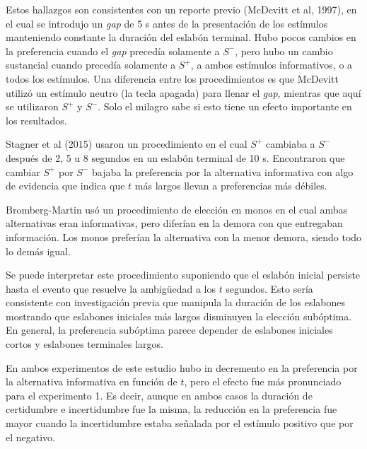 \documentclass[a4paper,12pt]{article}
\begin{document}
\vspace{2mm}
{\centering{}}
\vspace{2mm}

Estos hallazgos son consistentes con un reporte previo (McDevitt et al, 1997), en el cual se introdujo un {\slshape gap} de 5 s antes de la presentación de los estímulos manteniendo constante la duración del eslabón terminal.
Hubo pocos cambios en la preferencia cuando el {\slshape gap} precedía solamente a $S^{-}$, pero hubo un cambio sustancial cuando precedía solamente a $S^{+}$, a ambos estímulos informativos, o a todos los estímulos.
Una diferencia entre los procedimientos es que McDevitt utilizó un estímulo neutro (la tecla apagada) para llenar el {\slshape gap}, mientras que aquí se utilizaron $S^{+}$ y $S^{-}$.
Solo el milagro sabe si esto tiene un efecto importante en los resultados.

Stagner et al (2015) usaron un procedimiento en el cual $S^{+}$ cambiaba a $S^{-}$ después de 2, 5 u 8 segundos en un eslabón terminal de 10 s.
Encontraron que cambiar $S^{+}$ por $S^{-}$ bajaba la preferencia por la alternativa informativa con algo de evidencia que indica que $t$ más largos llevan a preferencias más débiles.

Bromberg-Martin usó un procedimiento de elección en monos en el cual ambas alternativas eran informativas, pero diferían en la demora con que entregaban información.
Los monos preferían la alternativa con la menor demora, siendo todo lo demás igual.

Se puede interpretar este procedimiento suponiendo que el eslabón inicial persiste hasta el evento que resuelve la ambigüedad a los $t$ segundos.
Esto sería consistente con investigación previa que manipula la duración de los eslabones mostrando que eslabones iniciales más largos disminuyen la elección subóptima.
En general, la preferencia subóptima parece depender de eslabones iniciales cortos y eslabones terminales largos.

En ambos experimentos de este estudio hubo in decremento en la preferencia por la alternativa informativa en función de $t$, pero el efecto fue más pronunciado para el experimento 1.
Es decir, aunque en ambos casos la duración de certidumbre e incertidumbre fue la misma, la reducción en la preferencia fue mayor cuando la incertidumbre estaba señalada por el estímulo positivo que por el negativo.
\end{document}
